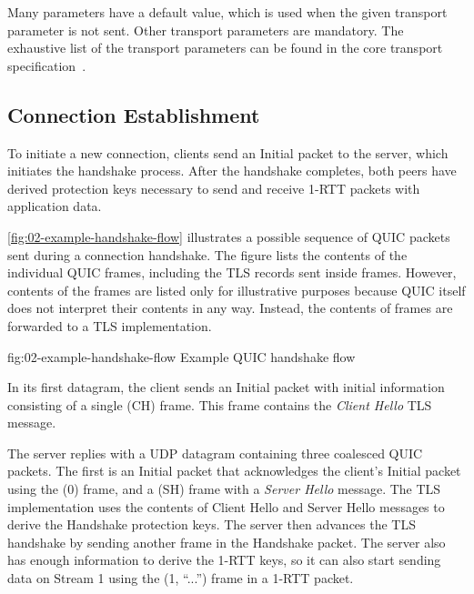 Many parameters have a default value, which is used when the given transport parameter is not sent.
Other transport parameters are mandatory. The exhaustive list of the transport parameters can be
found in the core transport specification~\autocite[Section~7.3]{draft-ietf-quic-transport}.

\subsection{Connection Establishment}\label{sec:02-connection-establishment}

To initiate a new connection, clients send an Initial packet to the server, which initiates the
handshake process. After the handshake completes, both peers have derived protection keys necessary
to send and receive 1-RTT packets with application data.

\autoref{fig:02-example-handshake-flow} illustrates a possible sequence of QUIC packets sent during
a connection handshake. The figure lists the contents of the individual QUIC frames, including the
TLS records sent inside \CRYPTO{} frames. However, contents of the \CRYPTO{} frames are listed only
for illustrative purposes because QUIC itself does not interpret their contents in any way. Instead,
the contents of \CRYPTO{} frames are forwarded to a TLS implementation.

\begin{myFigure} {fig:02-example-handshake-flow} {Example QUIC handshake flow}

\resizebox{\linewidth}{!}{}

\end{myFigure}

In its first datagram, the client sends an Initial packet with initial information consisting of a
single \CRYPTO{}(CH) frame. This frame contains the \textit{Client Hello} TLS message.

The server replies with a UDP datagram containing three coalesced QUIC packets. The first is an
Initial packet that acknowledges the client's Initial packet using the \ACK{}(0) frame, and a
\CRYPTO{}(SH) frame with a \textit{Server Hello} message. The TLS implementation uses the contents
of Client Hello and Server Hello messages to derive the Handshake protection keys. The server then
advances the TLS handshake by sending another \CRYPTO{} frame in the Handshake packet. The server
also has enough information to derive the 1-RTT keys, so it can also start sending data on Stream 1
using the \STREAM{}(1, ``...'') frame in a 1-RTT packet.

